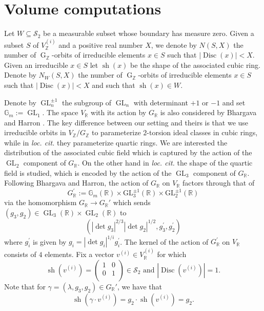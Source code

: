\documentclass[table]{amsart}
\newcommand{\Z}{\mathbb{Z}}
\newcommand{\op}[1]{\operatorname{#1}}
\newcommand\mtx[4] { \left( {\begin{array}{cc}
 #1 & #2 \\
 #3 & #4 \\
 \end{array} } \right)}
\numberwithin{equation}{section}
\begin{document}
\section{Volume computations}
\par Let $W\subseteq \mathcal{S}_2$ be a measurable subset whose boundary has measure zero. Given a subset $S$ of $V_{\Z}^{(i)}$ and a positive real number $X$, we denote by $N(S,X)$ the number of $\op{G}_{\Z}$-orbits of irreducible elements $x\in S$ such that $|\op{Disc}(x)|<X$. Given an irreducible $x\in S$ let $\op{sh}(x)$ be the shape of the associated cubic ring. Denote by $N_W(S,X)$ the number of $\op{G}_{\Z}$-orbits of irreducible elements $x\in S$ such that $|\op{Disc}(x)|<X$ and such that $\op{sh}(x)\in W$. 
\par Denote by $\op{GL}_n^{\pm1}$ the subgroup of $\op{GL}_n$ with determinant $+1$ or $-1$ and set $\mathbb{G}_m:=\op{GL}_1$. The space $V_{\mathbb{R}}$ with its action by $G_{\mathbb{R}}$ is also considered by Bhargava and Harron \cite{bhargavaharron}. The key difference between our setting and theirs is that we use irreducible orbits in $V_{\Z}/G_{\Z}$ to parameterize $2$-torsion ideal classes in cubic rings, while in \emph{loc. cit.} they parameterize quartic rings. We are interested the distribution of the associated cubic field which is captured by the action of the $\op{GL}_2$ component of $G_{\mathbb{R}}$. On the other hand in \emph{loc. cit.} the shape of the quartic field is studied, which is encoded by the action of the $\op{GL}_3$ component of $G_{\mathbb{R}}$. Following Bhargava and Harron, the action of $G_{\mathbb{R}}$ on $V_{\mathbb{R}}$ factors through that of \[G_{\mathbb{R}}^{\prime}:=\mathbb{G}_{m}(\mathbb{R}) \times \mathrm{GL}_{3}^{ \pm 1}(\mathbb{R}) \times \mathrm{GL}_{2}^{ \pm 1}(\mathbb{R})\] via the homomorphism $G_{\mathbb{R}}\rightarrow G_{\mathbb{R}}'$ which sends $(g_3,g_2)\in \op{GL}_3(\mathbb{R})\times \op{GL}_2(\mathbb{R})$ to 
\[\left(\left|\operatorname{det} g_{3}\right|^{2 /3}\left|\operatorname{det} g_{2}\right|^{1 /2}, g_{3}^{\prime}, g_{2}^{\prime}\right)\]
\noindent where $g_{i}^{\prime}$ is given by $g_{i}=\left|\operatorname{det} g_{i}\right|^{1 / i} g_{i}^{\prime}$. The kernel of the action of $G_{\mathbb{R}}^{\prime}$ on $V_{\mathbb{R}}$ consists of $4$ elements. Fix a vector $v^{(i)}\in V_{\mathbb{R}}^{(i)}$ for which \[\op{sh}(v^{(i)})=\mtx{1}{0}{0}{1}\in \mathcal{S}_2\text{ and }|\op{Disc}(v^{(i)})|=1.\] Note that for $\gamma=(\lambda, g_3, g_2)\in G_{\mathbb{R}}'$, we have that 
\[\op{sh}(\gamma\cdot v^{(i)})=g_2\cdot \op{sh}(v^{(i)})=g_2.\]
\end{document}
